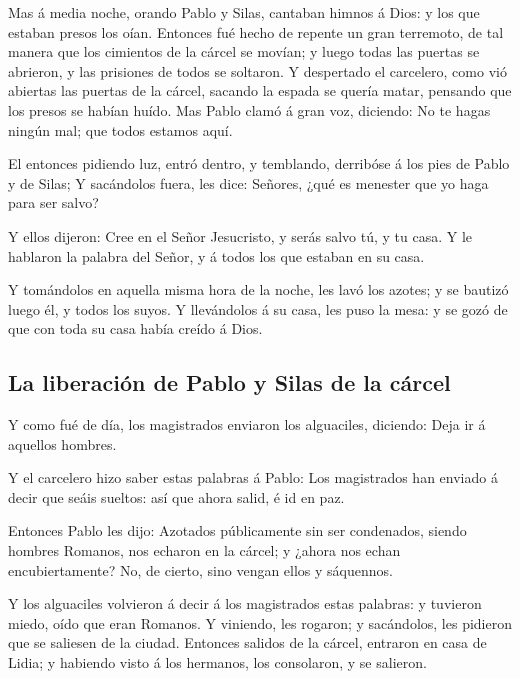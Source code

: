  Mas á media noche, orando Pablo y Silas, cantaban himnos
á Dios: y los que estaban presos los oían.  Entonces fué
hecho de repente un gran terremoto, de tal manera que los cimientos de
la cárcel se movían; y luego todas las puertas se abrieron, y las
prisiones de todos se soltaron.  Y despertado el
carcelero, como vió abiertas las puertas de la cárcel, sacando la espada
se quería matar, pensando que los presos se habían huído.
 Mas Pablo clamó á gran voz, diciendo: No te hagas ningún
mal; que todos estamos aquí.

 El entonces pidiendo luz, entró dentro, y temblando,
derribóse á los pies de Pablo y de Silas;  Y sacándolos
fuera, les dice: Señores, ¿qué es menester que yo haga para ser salvo?

 Y ellos dijeron: Cree en el Señor Jesucristo, y serás
salvo tú, y tu casa.  Y le hablaron la palabra del Señor,
y á todos los que estaban en su casa.

 Y tomándolos en aquella misma hora de la noche, les lavó
los azotes; y se bautizó luego él, y todos los suyos.  Y
llevándolos á su casa, les puso la mesa: y se gozó de que con toda su
casa había creído á Dios.

\hypertarget{la-liberaciuxf3n-de-pablo-y-silas-de-la-cuxe1rcel}{%
\subsection{La liberación de Pablo y Silas de la
cárcel}\label{la-liberaciuxf3n-de-pablo-y-silas-de-la-cuxe1rcel}}

 Y como fué de día, los magistrados enviaron los
alguaciles, diciendo: Deja ir á aquellos hombres.

 Y el carcelero hizo saber estas palabras á Pablo: Los
magistrados han enviado á decir que seáis sueltos: así que ahora salid,
é id en paz.

 Entonces Pablo les dijo: Azotados públicamente sin ser
condenados, siendo hombres Romanos, nos echaron en la cárcel; y ¿ahora
nos echan encubiertamente? No, de cierto, sino vengan ellos y sáquennos.

 Y los alguaciles volvieron á decir á los magistrados
estas palabras: y tuvieron miedo, oído que eran Romanos. 
Y viniendo, les rogaron; y sacándolos, les pidieron que se saliesen de
la ciudad.  Entonces salidos de la cárcel, entraron en
casa de Lidia; y habiendo visto á los hermanos, los consolaron, y se
salieron.

